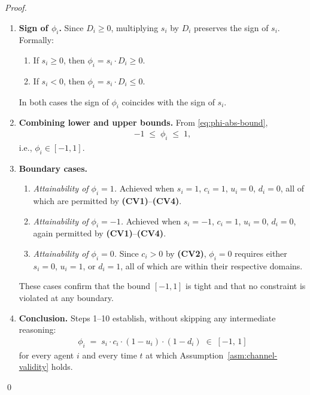 \documentclass[12pt,openany]{book}
\numberwithin{equation}{chapter}
\theoremstyle{plain}
\theoremstyle{definition}
\theoremstyle{remark}
\numberwithin{equation}{chapter}
\theoremstyle{plain}
\begin{document}
\begin{proof}
\begin{enumerate}
  \item \textbf{Sign of $\phi_i$.}
        Since $D_i \geq 0$, multiplying $s_i$ by $D_i$ preserves
        the sign of $s_i$.  Formally:
        \begin{enumerate}
          \item If $s_i \geq 0$, then
                $\phi_i = s_i \cdot D_i \geq 0$.
          \item If $s_i < 0$, then
                $\phi_i = s_i \cdot D_i \leq 0$.
        \end{enumerate}
        In both cases the sign of $\phi_i$ coincides with the sign of
        $s_i$.

  \item \textbf{Combining lower and upper bounds.}
        From \eqref{eq:phi-abs-bound},
        \begin{align}
          -1 \;\leq\; \phi_i \;\leq\; 1,
        \end{align}
        i.e., $\phi_i \in [-1,1]$.

  \item \textbf{Boundary cases.}
        \begin{enumerate}
          \item \emph{Attainability of $\phi_i = 1$.}
                Achieved when $s_i = 1$, $c_i = 1$, $u_i = 0$,
                $d_i = 0$, all of which are permitted by
                \textbf{(CV1)}--\textbf{(CV4)}.
          \item \emph{Attainability of $\phi_i = -1$.}
                Achieved when $s_i = -1$, $c_i = 1$, $u_i = 0$,
                $d_i = 0$, again permitted by
                \textbf{(CV1)}--\textbf{(CV4)}.
          \item \emph{Attainability of $\phi_i = 0$.}
                Since $c_i > 0$ by \textbf{(CV2)}, $\phi_i = 0$
                requires either $s_i = 0$, $u_i = 1$, or $d_i = 1$,
                all of which are within their respective domains.
        \end{enumerate}
        These cases confirm that the bound $[-1,1]$ is tight and that
        no constraint is violated at any boundary.

  \item \textbf{Conclusion.}
        Steps 1--10 establish, without skipping any intermediate
        reasoning:
        \begin{align}
          \phi_i \;=\; s_i \cdot c_i \cdot (1-u_i) \cdot (1-d_i)
          \;\in\; [-1,\,1]
        \end{align}
        for every agent $i$ and every time $t$ at which
        Assumption~\ref{asm:channel-validity} holds.

\end{enumerate}
\qed
\end{proof}
\end{document}
